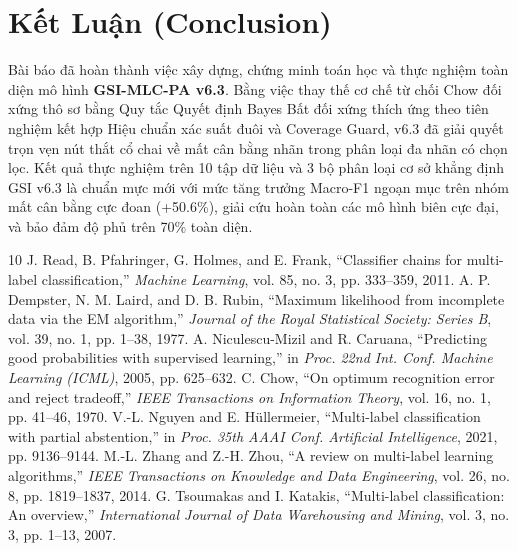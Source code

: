 \documentclass[10pt,a4paper,twoside]{article}
\begin{document}
\section{Kết Luận (Conclusion)}
Bài báo đã hoàn thành việc xây dựng, chứng minh toán học và thực nghiệm toàn diện mô hình \textbf{GSI-MLC-PA v6.3}. Bằng việc thay thế cơ chế từ chối Chow đối xứng thô sơ bằng Quy tắc Quyết định Bayes Bất đối xứng thích ứng theo tiên nghiệm kết hợp Hiệu chuẩn xác suất đuôi và Coverage Guard, v6.3 đã giải quyết trọn vẹn nút thắt cổ chai về mất cân bằng nhãn trong phân loại đa nhãn có chọn lọc. Kết quả thực nghiệm trên 10 tập dữ liệu và 3 bộ phân loại cơ sở khẳng định GSI v6.3 là chuẩn mực mới với mức tăng trưởng Macro-F1 ngoạn mục trên nhóm mất cân bằng cực đoan (+50.6\%), giải cứu hoàn toàn các mô hình biên cực đại, và bảo đảm độ phủ trên 70\% toàn diện.
\begin{thebibliography}{10}
 J. Read, B. Pfahringer, G. Holmes, and E. Frank, ``Classifier chains for multi-label classification,'' \textit{Machine Learning}, vol. 85, no. 3, pp. 333--359, 2011.
 A. P. Dempster, N. M. Laird, and D. B. Rubin, ``Maximum likelihood from incomplete data via the EM algorithm,'' \textit{Journal of the Royal Statistical Society: Series B}, vol. 39, no. 1, pp. 1--38, 1977.
 A. Niculescu-Mizil and R. Caruana, ``Predicting good probabilities with supervised learning,'' in \textit{Proc. 22nd Int. Conf. Machine Learning (ICML)}, 2005, pp. 625--632.
 C. Chow, ``On optimum recognition error and reject tradeoff,'' \textit{IEEE Transactions on Information Theory}, vol. 16, no. 1, pp. 41--46, 1970.
 V.-L. Nguyen and E. H{\"u}llermeier, ``Multi-label classification with partial abstention,'' in \textit{Proc. 35th AAAI Conf. Artificial Intelligence}, 2021, pp. 9136--9144.
 M.-L. Zhang and Z.-H. Zhou, ``A review on multi-label learning algorithms,'' \textit{IEEE Transactions on Knowledge and Data Engineering}, vol. 26, no. 8, pp. 1819--1837, 2014.
 G. Tsoumakas and I. Katakis, ``Multi-label classification: An overview,'' \textit{International Journal of Data Warehousing and Mining}, vol. 3, no. 3, pp. 1--13, 2007.
\end{thebibliography}
\end{document}
